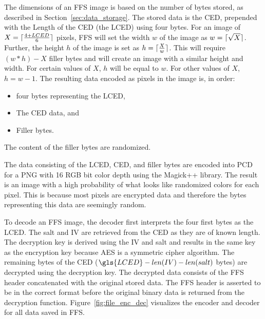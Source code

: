 The dimensions of an \gls{FFS} image is based on the number of bytes stored, as described in Section~\ref{sec:data_storage}. The stored data is the CED, prepended with the Length of the \gls{CED} (the \gls{LCED}) using four bytes. For an image of $X = \lceil \frac{4 + LCED}{6} \rceil$ pixels, \gls{FFS} will set the width $w$ of the image as $w = \lceil \sqrt{X} \rceil$. Further, the height $h$ of the image is set as $h = \lceil \frac{X}{w} \rceil$. This will require $(w * h) - X$ filler bytes and will create an image with a similar height and width. For certain values of $X$, $h$ will be equal to $w$. For other values of $X$, $h = w-1$. The resulting data encoded as pixels in the image is, in order:
\begin{itemize}
	\item four bytes representing the \gls{LCED},
	\item The \gls{CED} data, and
	\item Filler bytes.
\end{itemize}
The content of the filler bytes are randomized.

The data consisting of the \gls{LCED}, CED, and filler bytes are encoded into \gls{PCD} for a PNG with 16 \gls{RGB} bit color depth using the Magick++ library. The result is an image with a high probability of what looks like randomized colors for each pixel. This is because most pixels are encrypted data and therefore the bytes representing this data are seemingly random.

To decode an \gls{FFS} image, the decoder first interprets the four first bytes as the \gls{LCED}. The salt and \gls{IV} are retrieved from the \gls{CED} as they are of known length. The decryption key is derived using the \gls{IV} and salt and results in the same key as the encryption key because \gls{AES} is a symmetric cipher algorithm. The remaining bytes of the \gls{CED} ($\gls{LCED} - len(IV) - len(salt)$ bytes) are decrypted using the decryption key. The decrypted data consists of the \gls{FFS} header concatenated with the original stored data. The \gls{FFS} header is asserted to be in the correct format before the original binary data is returned from the decryption function. Figure~\ref{fig:file_enc_dec} visualizes the encoder and decoder for all data saved in \gls{FFS}.

